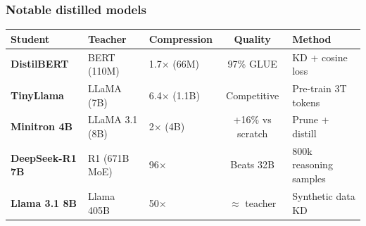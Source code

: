 \documentclass[aspectratio=169]{beamer}
\begin{document}
\begin{frame}
\frametitle{Notable distilled models}

\vspace{-0.4cm}
\renewcommand{\arraystretch}{1.3}
\begin{center}
{\scriptsize
\begin{tabular}{>{\bfseries}l l l c l}
  \textbf{Student} & \textbf{Teacher} & \textbf{Compression} & \textbf{Quality} & \textbf{Method} \\
  \hline
  \textcolor{popblue}{DistilBERT} & BERT (110M) & 1.7$\times$ (66M) & 97\% GLUE & KD + cosine loss \\[2pt]
  \textcolor{paramgreen}{TinyLlama} & LLaMA (7B) & 6.4$\times$ (1.1B) & Competitive & Pre-train 3T tokens \\[2pt]
  \textcolor{orange1}{Minitron 4B} & LLaMA 3.1 (8B) & 2$\times$ (4B) & +16\% vs scratch & Prune + distill \\[2pt]
  \textcolor{violet1}{DeepSeek-R1 7B} & R1 (671B MoE) & 96$\times$ & Beats 32B & 800k reasoning samples \\[2pt]
  \textcolor{sampred}{Llama 3.1 8B} & Llama 405B & 50$\times$ & $\approx$ teacher & Synthetic data KD \\
  \hline
\end{tabular}
}
\end{center}

\vspace{0.1cm}
\begin{center}
\end{center}
\end{frame}
\end{document}
